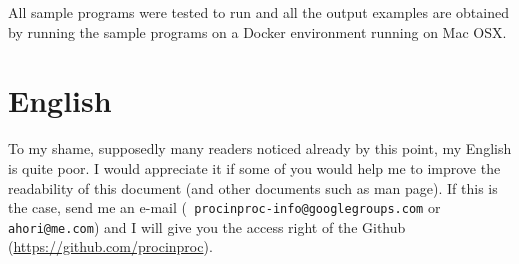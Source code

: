 All sample programs were tested to run and all the output examples are
obtained by running the sample programs on a Docker environment
running on Mac OSX.

\section*{English}

To my shame, supposedly many readers noticed already by this point, my
English is quite poor. I would appreciate it if some of you would help
me to improve the readability of this document (and other documents
such as man page). If this is the case, send me an e-mail ({\tt
  procinproc-info@googlegroups.com} or {\tt ahori@me.com}) and I will 
give you the access right of the Github
(\url{https://github.com/procinproc}). 

